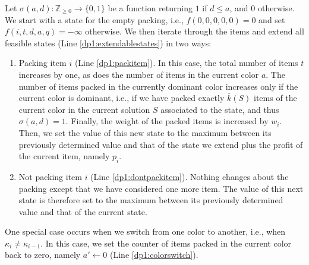 \documentclass[preprint,11pt]{elsarticle}
\theoremstyle{definition}
\begin{document}
\smallskip

Let $\sigma(a, d): \mathbb{Z}_{\ge 0} \to \{0, 1\}$ be a function returning $1$ if $d \le a$, and $0$ otherwise. 
We start with a state for the empty packing, i.e., $f(0,0,0,0,0) = 0$ and set $f(i,t,d,a,q) = -\infty$ otherwise.
We then iterate through the items and extend all feasible states (Line \ref{dp1:extendablestates}) in two ways: 
\begin{enumerate}
    \item[i)] Packing item $i$ (Line \ref{dp1:packitem}). In this case, the total number of items $t$ increases by one, as does the number of items in the current color $a$. 
    The number of items packed in the currently dominant color increases only if the current color is dominant, i.e., if we have packed exactly $\overline k(S)$ items of the current color in the current solution $S$ associated to the state, and thus $\sigma(a,d) = 1$.  Finally, the weight of the packed items is increased by $w_i$. 
    Then, we set the value of this new state to the maximum between its previously determined value and that of the state we extend plus the profit of the current item, namely $p_i$.
    \item[ii)] Not packing item $i$ (Line \ref{dp1:dontpackitem}). Nothing changes about the packing except that we have considered one more item. The value of this next state is therefore set to the maximum between its previously determined value and that of the current state. 
\end{enumerate}

One special case occurs when we switch from one color to another, i.e., when $\kappa_i \neq \kappa_{i-1}$.
In this case, we set the counter of items packed in the current color back to zero, namely $a' \gets 0$ (Line \ref{dp1:colorswitch}).
\end{document}
